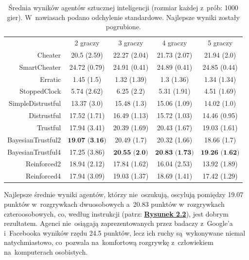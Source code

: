 \documentclass[declaration,shortabstract,inz]{iithesis}
\begin{document}
\begin{table}[H]
	\centering
	\captionsetup{format=hang}
	\begin{tabular}{ r|c|c|c|c| }		
 		\multicolumn{1}{r}{}		
 		 & \multicolumn{1}{c}{2 graczy}		
 		 & \multicolumn{1}{c}{3 graczy}		
 		 & \multicolumn{1}{c}{4 graczy}		
 		 & \multicolumn{1}{c}{5 graczy} \\		
 		\cline{2-5}		
 		Cheater & 20.5 (2.59) & 22.27 (2.04) & 21.73 (2.07) & 21.94 (2.0) \\		
 		\cline{2-5}		
 		SmartCheater & 24.72 (0.79) & 24.91 (0.41) & 24.89 (0.41) & 24.85 (0.44) \\		
 		\cline{2-5}		
 		Erratic & 1.45 (1.5) & 1.32 (1.39) & 1.3 (1.36) & 1.34 (1.34) \\
 		\cline{2-5}		
 		StoppedClock & 5.74 (2.62) & 6.25 (2.2) & 5.31 (1.91) & 4.51 (1.69) \\
 		\cline{2-5}		
 		SimpleDistrustful & 13.37 (3.0) & 15.48 (1.3) & 15.06 (1.09) & 14.02 (1.0) \\
 		\cline{2-5}		
 		Distrustful & 17.52 (1.71) & 16.49 (1.13) & 15.72 (1.03) & 14.46 (0.95) \\
 		\cline{2-5}		
 		Trustful & 17.94 (3.41) & 20.39 (1.69) & 20.43 (1.67) & 19.03 (1.61) \\
 		\cline{2-5}		
 		BayesianTrustful2 & $\textbf{19.07 (3.16)}$ & 20.49 (1.7) & 20.32 (1.66) & 18.66 (1.7) \\
 		\cline{2-5}		
 		BayesianTrustful4 & 17.25 (3.86) & $\textbf{20.55 (2.0)}$ & $\textbf{20.83 (1.73)}$ & $\textbf{19.26 (1.62)}$ \\
 		\cline{2-5}		
 		Reinforced2 & 18.94 (2.12) & 17.84 (1.62) & 16.04 (2.53) & 13.92 (1.89) \\
 		\cline{2-5}		
 		Reinforced4 & 17.94 (3.09) & 19.03 (1.37) & 18.69 (1.41) & 17.42 (1.29) \\
 		\cline{2-5}		
 	\end{tabular}		
 	\caption{Średnia wyników agentów sztucznej inteligencji (rozmiar każdej z~prób: 1000 gier). W~nawiasach podano odchylenie standardowe. Najlepsze wyniki zostały pogrubione.}		
 	\label{table:summary}		
 \end{table}
 
Najlepsze średnie wyniki agentów, którzy nie~oszukują, oscylują pomiędzy 19.07 punktów w~rozgrywkach dwuosobowych a~20.83 punktów w~rozgrywkach czteroosobowych, co, według instrukcji (patrz: \hyperref[fig:scores]{\textbf{Rysunek 2.2}}), jest dobrym rezultatem. Agenci nie~osiągają zaprezentowanych przez badaczy z~Google'a i~Facebooka wyników rzędu 24.5 punktów, lecz ich ruchy są~wykonywane niemal natychmiastowo, co~pozwala na~komfortową rozgrywkę z~człowiekiem na~komputerach osobistych.
 
\end{document}
